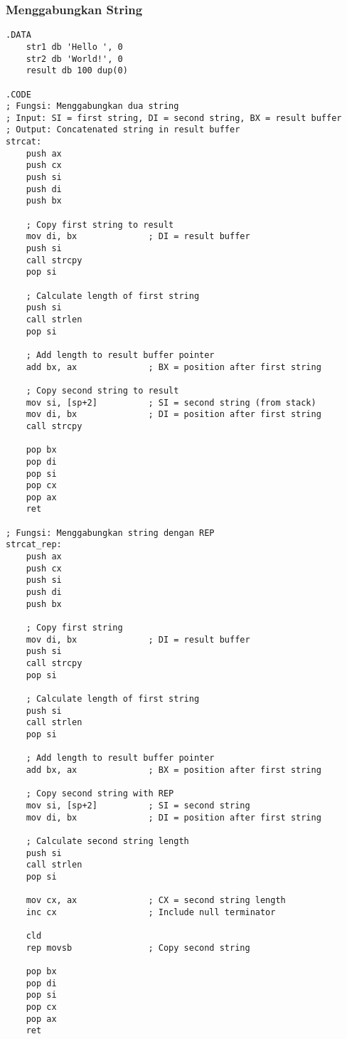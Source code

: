 \documentclass[../main.tex]{subfiles}
\begin{document}
            \subsubsection{Menggabungkan String}
                \begin{lstlisting}[language={[x86masm]Assembler}, caption=Menggabungkan String, label={lst:string-concatenate}]
.DATA
    str1 db 'Hello ', 0
    str2 db 'World!', 0
    result db 100 dup(0)

.CODE
; Fungsi: Menggabungkan dua string
; Input: SI = first string, DI = second string, BX = result buffer
; Output: Concatenated string in result buffer
strcat:
    push ax
    push cx
    push si
    push di
    push bx
    
    ; Copy first string to result
    mov di, bx              ; DI = result buffer
    push si
    call strcpy
    pop si
    
    ; Calculate length of first string
    push si
    call strlen
    pop si
    
    ; Add length to result buffer pointer
    add bx, ax              ; BX = position after first string
    
    ; Copy second string to result
    mov si, [sp+2]          ; SI = second string (from stack)
    mov di, bx              ; DI = position after first string
    call strcpy
    
    pop bx
    pop di
    pop si
    pop cx
    pop ax
    ret

; Fungsi: Menggabungkan string dengan REP
strcat_rep:
    push ax
    push cx
    push si
    push di
    push bx
    
    ; Copy first string
    mov di, bx              ; DI = result buffer
    push si
    call strcpy
    pop si
    
    ; Calculate length of first string
    push si
    call strlen
    pop si
    
    ; Add length to result buffer pointer
    add bx, ax              ; BX = position after first string
    
    ; Copy second string with REP
    mov si, [sp+2]          ; SI = second string
    mov di, bx              ; DI = position after first string
    
    ; Calculate second string length
    push si
    call strlen
    pop si
    
    mov cx, ax              ; CX = second string length
    inc cx                  ; Include null terminator
    
    cld
    rep movsb               ; Copy second string
    
    pop bx
    pop di
    pop si
    pop cx
    pop ax
    ret
                \end{lstlisting}
\end{document}
